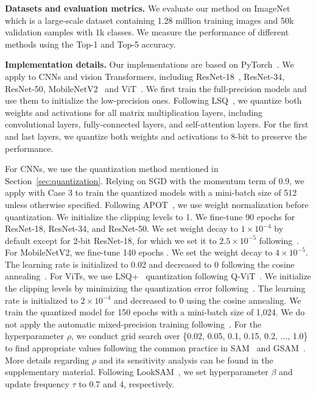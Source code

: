\noindent\textbf{Datasets and evaluation metrics.} We evaluate our method on  ImageNet~\cite{deng2009imagenet} which is a large-scale dataset containing 1.28 million training images and 50k validation samples with 1k classes.
We measure the performance of different methods using the Top-1 and Top-5 accuracy. 

\noindent\textbf{Implementation details.}
Our implementations are based on PyTorch~\cite{paszke2019pytorch}. We apply \methodshortname to CNNs and vision Transformers, including ResNet-18~\cite{he2016deep}, ResNet-34, ResNet-50,  MobileNetV2~\cite{sandler2018inverted} and ViT~\cite{dosovitskiy2020image}. 
We first train the full-precision models and use them to initialize the low-precision ones. Following LSQ~\cite{Esser2020LEARNED}, we quantize both weights and activations for all matrix multiplication layers, including convolutional layers, fully-connected layers, and self-attention layers. For the first and last layers, we quantize both weights and activations to 8-bit to preserve the performance.  

For CNNs, we use the  quantization method mentioned in Section~\ref{sec:quantization}. Relying on SGD with the momentum term of 0.9, we apply \methodshortname with Case 3 to train the quantized models with a mini-batch size of 512 unless otherwise specified. Following APOT~\cite{Li2020Additive}, we use weight normalization before quantization. We initialize the clipping levels to 1. We fine-tune 90 epochs for ResNet-18, ResNet-34, and ResNet-50. We set weight decay to $1\times10^{-4}$ by default except for 2-bit ResNet-18, for which we set it to $2.5\times10^{-5}$ following~\cite{Esser2020LEARNED}.
For MobileNetV2, we fine-tune 140 epochs 
. We set the weight decay to $4\times10^{-5}$.
The learning rate is initialized to 0.02 and decreased to 0 following the cosine annealing~\cite{loshchilov2016sgdr}. For ViTs, we use LSQ+~\cite{bhalgat2020lsq+}  quantization following Q-ViT~\cite{li2022q}. We initialize the clipping levels by minimizing the quantization error following~\cite{li2021fixed}.  The learning rate is initialized to $2 \times 10^{-4}$ and decreased to 0 using the cosine annealing. We train the quantized model for 150 epochs with a mini-batch size of 1,024. 
We do not apply the automatic mixed-precision training following~\cite{li2022q}. For the hyperparameter $\rho$, we conduct grid search over \{0.02, 0.05, 0.1, 0.15, 0.2, $\dots$, 1.0\} to find appropriate values following the common practice in SAM~\cite{foret2021sharpnessaware} and GSAM~\cite{zhuang2021surrogate}. More details regarding $\rho$ and its sensitivity analysis can be found in the supplementary material.
Following LookSAM~\cite{liu2022towards}, we set hyperparameter $\beta$ and update frequency $\tau$ to 0.7 and 4, respectively. 

